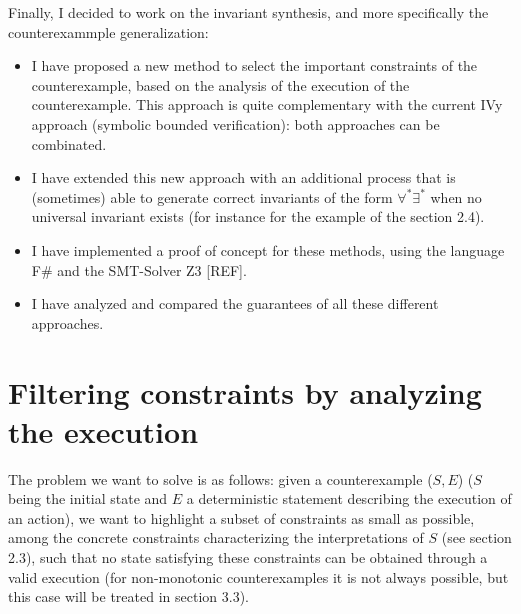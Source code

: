 \documentclass[11pt,a4paper,oldfontcommands,openany]{memoir}
\begin{document}
    Finally, I decided to work on the invariant synthesis, and more specifically the counterexammple generalization:
    \begin{itemize}
        \item I have proposed a new method to select the important constraints of the counterexample, based on the analysis of the execution of the counterexample.
        This approach is quite complementary with the current IVy approach (symbolic bounded verification): both approaches can be combinated. 
        \item I have extended this new approach with an additional process that is (sometimes) able to generate correct invariants of the form \(\forall^*\exists^*\)
        when no universal invariant exists (for instance for the example of the section 2.4).
        \item I have implemented a proof of concept for these methods, using the language F\# and the SMT-Solver Z3 [REF].        
        \item I have analyzed and compared the guarantees of all these different approaches.
    \end{itemize}

    \section{Filtering constraints by analyzing the execution}

    The problem we want to solve is as follows: given a counterexample (\(S,E\)) (\(S\) being the initial state and \(E\) a deterministic statement describing the execution of an action),
    we want to highlight a subset of constraints as small as possible, among the concrete constraints characterizing the interpretations of \(S\) (see section 2.3), such that no state satisfying these constraints
    can be obtained through a valid execution (for non-monotonic counterexamples it is not always possible, but this case will be treated in section 3.3).
\end{document}
